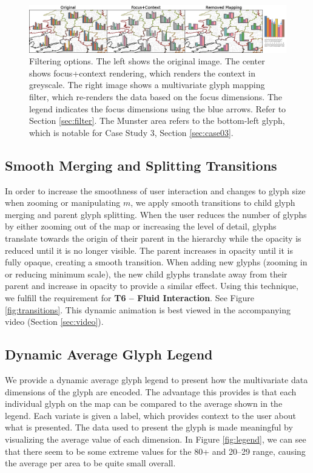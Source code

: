 \begin{figure}[t]
\centering
\includegraphics[width=1\textwidth]{images/f+cv2} %
\caption{Filtering options. The left shows the original image. The center shows focus+context rendering, which renders the context in greyscale. The right image shows a multivariate glyph mapping filter, which re-renders the data based on the focus dimensions. The legend indicates the focus dimensions using the blue arrows. Refer to Section \ref{sec:filter}. The Munster area refers to the bottom-left glyph, which is notable for Case Study 3, Section \ref{sec:case03}.} \label{fig:f+c}  \vspace{-0.2cm}
\end{figure}
\subsection{Smooth Merging and Splitting Transitions} \label{sec:transitions}
In order to increase the smoothness of user interaction and changes to glyph size when zooming or manipulating $m$, we apply smooth transitions to child glyph merging and parent glyph splitting. When the user reduces the number of glyphs by either zooming out of the map or increasing the level of detail, glyphs translate towards the origin of their parent in the hierarchy while the opacity is reduced until it is no longer visible. The parent increases in opacity until it is fully opaque, creating a smooth transition. When adding new glyphs (zooming in or reducing minimum scale), the new child glyphs translate away from their parent and increase in opacity to provide a similar effect. Using this technique, we fulfill the requirement for \textbf{T6 -- Fluid Interaction}. See Figure \ref{fig:transitions}. This dynamic animation is best viewed in the accompanying video (Section \ref{sec:video}).


\subsection{Dynamic Average Glyph Legend} \label{sec:legend}
We provide a dynamic average glyph legend to present how the multivariate data dimensions of the glyph are encoded. The advantage this provides is that each individual glyph on the map can be compared to the average shown in the legend. Each variate is given a label, which provides context to the user about what is presented. The data used to present the glyph is made meaningful by visualizing the average value of each dimension. In Figure \ref{fig:legend}, we can see that there seem to be some extreme values for the 80+ and 20--29 range, causing the average per area to be quite small overall.


